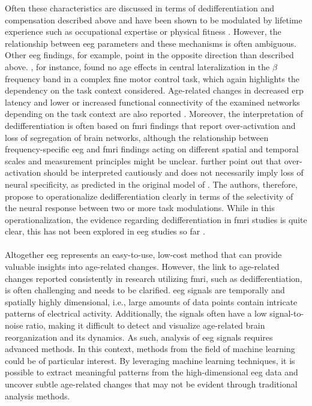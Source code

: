 Often these characteristics are discussed in terms of dedifferentiation and compensation described above and have been shown to be modulated by lifetime experience such as occupational expertise \cite{Vieluf2018} or physical fitness \cite{Douw2014}. However, the relationship between \gls{eeg} parameters and these mechanisms is often ambiguous. Other \gls{eeg} findings, for example, point in the opposite direction than described above. \citeauthor{Hübner2018a} \cite{Hübner2018a}, for instance, found no age effects in central lateralization in the $\beta$ frequency band in a complex fine motor control task, which again highlights the dependency on the task context considered. Age-related changes in decreased \gls{erp} latency and lower or increased functional connectivity of the examined networks depending on the task context are also reported \cite{Courtney2021}. Moreover, the interpretation of dedifferentiation is often based on \gls{fmri} findings that report over-activation and loss of segregation of brain networks, although the relationship between frequency-specific \gls{eeg} and \gls{fmri} findings acting on different spatial and temporal scales and measurement principles might be unclear. \citeauthor{Koen2019} \cite{Koen2019} further point out that over-activation should be interpreted cautiously and does not necessarily imply loss of neural specificity, as predicted in the original model of \citeauthor{Li2000} \cite{Li2000,Li2001}. The authors, therefore, propose to operationalize dedifferentiation clearly in terms of the selectivity of the neural response between two or more task modulations. While in this operationalization, the evidence regarding dedifferentiation in \gls{fmri} studies is quite clear, this has not been explored in \gls{eeg} studies so far \cite{Koen2019}.\\
\\
Altogether \gls{eeg} represents an easy-to-use, low-cost method that can provide valuable insights into age-related changes. However, the link to age-related changes reported consistently in research utilizing \gls{fmri}, such as dedifferentiation, is often challenging and needs to be clarified. \Gls{eeg} signals are temporally and spatially highly dimensional, i.e., large amounts of data points contain intricate patterns of electrical activity. Additionally, the signals often have a low signal-to-noise ratio, making it difficult to detect and visualize age-related brain reorganization and its dynamics. As such, analysis of \gls{eeg} signals requires advanced methods. In this context, methods from the field of machine learning could be of particular interest. By leveraging machine learning techniques, it is possible to extract meaningful patterns from the high-dimensional \gls{eeg} data and uncover subtle age-related changes that may not be evident through traditional analysis methods.
